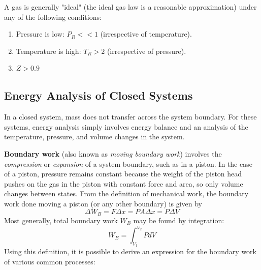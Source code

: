 \begin{shaded}
    A gas is generally "ideal" (the ideal gas law is a reasonable approximation) under any of the following conditions:
    \begin{enumerate}
        \item Pressure is low: $P_{R}<<1$ (irrespective of temperature).
        \item Temperature is high: $T_R > 2$ (irrespective of pressure).
        \item $Z > 0.9$
    \end{enumerate}
\end{shaded}

\subsection{Energy Analysis of Closed Systems}

In a closed system, mass does not transfer across the system boundary. For these systems, energy analysis simply involves energy balance and an analysis of the temperature, pressure, and volume changes in the system.

\textbf{Boundary work} (also known as \textit{moving boundary work}) involves the \textit{compression} or \textit{expansion} of a system boundary, such as in a piston. In the case of a piston, pressure remains constant because the weight of the piston head pushes on the gas in the piston with constant force and area, so only volume changes between states. From the definition of mechanical work, the boundary work done moving a piston (or any other boundary) is given by \[\Delta W_B = F\Delta x = PA\Delta x = P\Delta V\] Most generally, total boundary work $W_B$ may be found by integration: \[W_B = \int_{V_1}^{V_2} PdV\]
Using this definition, it is possible to derive an expression for the boundary work of various common processes:

